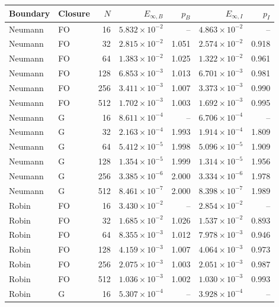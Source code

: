\begin{table}[htbp]
\centering
\scriptsize
\setlength{\tabcolsep}{4pt}
\begin{tabular}{llrrrrr}
\toprule
Boundary & Closure & $N$ & $E_{\infty,B}$ & $p_B$ & $E_{\infty,I}$ & $p_I$ \\
\midrule
Neumann & FO & 16 & $5.832\times10^{-2}$ & -- & $4.863\times10^{-2}$ & -- \\
Neumann & FO & 32 & $2.815\times10^{-2}$ & 1.051 & $2.574\times10^{-2}$ & 0.918 \\
Neumann & FO & 64 & $1.383\times10^{-2}$ & 1.025 & $1.322\times10^{-2}$ & 0.961 \\
Neumann & FO & 128 & $6.853\times10^{-3}$ & 1.013 & $6.701\times10^{-3}$ & 0.981 \\
Neumann & FO & 256 & $3.411\times10^{-3}$ & 1.007 & $3.373\times10^{-3}$ & 0.990 \\
Neumann & FO & 512 & $1.702\times10^{-3}$ & 1.003 & $1.692\times10^{-3}$ & 0.995 \\
Neumann & G & 16 & $8.611\times10^{-4}$ & -- & $6.706\times10^{-4}$ & -- \\
Neumann & G & 32 & $2.163\times10^{-4}$ & 1.993 & $1.914\times10^{-4}$ & 1.809 \\
Neumann & G & 64 & $5.412\times10^{-5}$ & 1.998 & $5.096\times10^{-5}$ & 1.909 \\
Neumann & G & 128 & $1.354\times10^{-5}$ & 1.999 & $1.314\times10^{-5}$ & 1.956 \\
Neumann & G & 256 & $3.385\times10^{-6}$ & 2.000 & $3.334\times10^{-6}$ & 1.978 \\
Neumann & G & 512 & $8.461\times10^{-7}$ & 2.000 & $8.398\times10^{-7}$ & 1.989 \\
Robin & FO & 16 & $3.430\times10^{-2}$ & -- & $2.854\times10^{-2}$ & -- \\
Robin & FO & 32 & $1.685\times10^{-2}$ & 1.026 & $1.537\times10^{-2}$ & 0.893 \\
Robin & FO & 64 & $8.355\times10^{-3}$ & 1.012 & $7.978\times10^{-3}$ & 0.946 \\
Robin & FO & 128 & $4.159\times10^{-3}$ & 1.007 & $4.064\times10^{-3}$ & 0.973 \\
Robin & FO & 256 & $2.075\times10^{-3}$ & 1.003 & $2.051\times10^{-3}$ & 0.987 \\
Robin & FO & 512 & $1.036\times10^{-3}$ & 1.002 & $1.030\times10^{-3}$ & 0.993 \\
Robin & G & 16 & $5.307\times10^{-4}$ & -- & $3.928\times10^{-4}$ & -- \\

\end{tabular}
\end{table}
